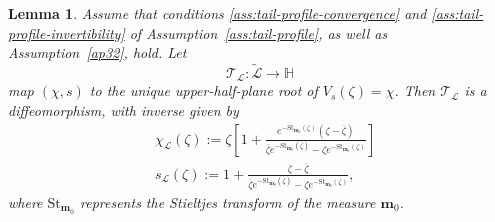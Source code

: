 \documentclass[11pt]{amsart}
\theoremstyle{plain}
\newtheorem{lemma}[theorem]{Lemma}
\newcommand\ol{\overline}
\newcommand\bm{\mathbf{m}}
\numberwithin{equation}{section}
\numberwithin{theorem}{section}
\numberwithin{figure}{section}
\begin{document}
\begin{lemma}\label{lrd}
Assume that conditions
\ref{ass:tail-profile-convergence} and
\ref{ass:tail-profile-invertibility} of
Assumption~\ref{ass:tail-profile}, as well as
Assumption~\ref{ap32}, hold. Let
\[
    \mathcal T_{\mathcal L}:\widetilde{\mathcal L}\longrightarrow\mathbb H
\]
map $(\chi,s)$ to the unique upper-half-plane root of
$V_s(\zeta)=\chi$. Then $\mathcal T_{\mathcal L}$ is a
diffeomorphism, with inverse given by
\begin{align}
    &\chi_{\mathcal{L}}(\zeta):=\zeta\left[1+\frac{e^{-\mathrm{St}_{\bm_0}(\zeta)}(\zeta-\ol{\zeta})}{\ol{\zeta}e^{-\mathrm{St}_{\bm_0}(\ol{\zeta})}-\zeta e^{-\mathrm{St}_{\bm_0}(\zeta)}}\right]\label{dc}\\
    &s_{\mathcal{L}}(\zeta):=1+\frac{\zeta-\ol{\zeta}}{\ol{\zeta}e^{-\mathrm{St}_{\bm_0}(\ol{\zeta})}-\zeta e^{-\mathrm{St}_{\bm_0}(\zeta)}},\label{ds}
\end{align}
 where $\mathrm{St}_{\bm_0}$ represents the Stieltjes transform of the measure $\bm_0$.
\end{lemma}
\end{document}
